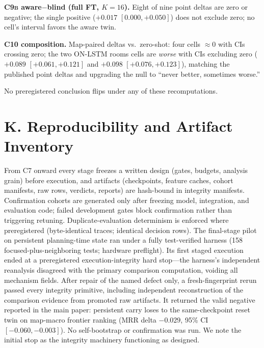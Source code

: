 \documentclass[letterpaper]{article} %
\newcommand{\stage}[1]{\textsc{#1}}
\begin{document}
\textbf{\stage{C9b} aware$-$blind (full FT, $K{=}16$).} Eight of nine point deltas are zero or negative; the single positive ($+0.017$ $[0.000,+0.050]$) does not exclude zero; no cell's interval favors the aware twin.

\textbf{\stage{C10} composition.} Map-paired deltas vs.\ zero-shot: four cells $\approx$0 with CIs crossing zero; the two ON-LSTM rooms cells are \emph{worse} with CIs excluding zero ($+0.089$ $[+0.061,+0.121]$ and $+0.098$ $[+0.076,+0.123]$), matching the published point deltas and upgrading the null to ``never better, sometimes worse.''

No preregistered conclusion flips under any of these recomputations.

\section{K. Reproducibility and Artifact Inventory}

From \stage{C7} onward every stage freezes a written design (gates, budgets, analysis grain) before execution, and artifacts (checkpoints, feature caches, cohort manifests, raw rows, verdicts, reports) are hash-bound in integrity manifests. Confirmation cohorts are generated only after freezing model, integration, and evaluation code; failed development gates block confirmation rather than triggering retuning. Duplicate-evaluation determinism is enforced where preregistered (byte-identical traces; identical decision rows). The final-stage pilot on persistent planning-time state ran under a fully test-verified harness (158 focused-plus-neighboring tests; hardware preflight). Its first staged execution ended at a preregistered execution-integrity hard stop---the harness's independent reanalysis disagreed with the primary comparison computation, voiding all mechanism fields. After repair of the named defect only, a fresh-fingerprint rerun passed every integrity primitive, including independent reconstruction of the comparison evidence from promoted raw artifacts. It returned the valid negative reported in the main paper: persistent carry loses to the same-checkpoint reset twin on map-macro frontier ranking (MRR delta $-0.029$, 95\% CI $[-0.060,-0.003]$). No self-bootstrap or confirmation was run. We note the initial stop as the integrity machinery functioning as designed.
\end{document}
